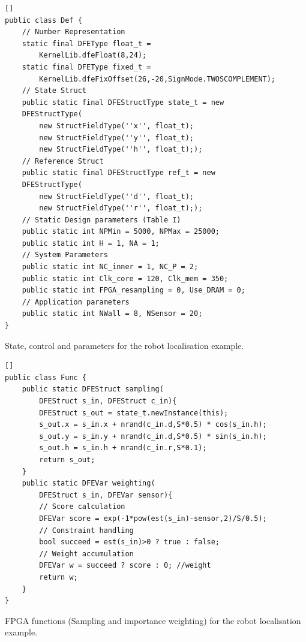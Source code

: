 \begin{Code}
    \centering
\lstset{language=Java,
        basicstyle=\ttfamily\small,
				tabsize=2,
				numbers=left,
				numberstyle=\tiny,
				frame=tb,
				columns=fullflexible,
				showstringspaces=false
				}
\begin{lstlisting}[][]
public class Def {
	// Number Representation
	static final DFEType float_t = 
		KernelLib.dfeFloat(8,24);
	static final DFEType fixed_t = 
		KernelLib.dfeFixOffset(26,-20,SignMode.TWOSCOMPLEMENT);
	// State Struct
	public static final DFEStructType state_t = new 
	DFEStructType(
		new StructFieldType(''x'', float_t);
		new StructFieldType(''y'', float_t);
		new StructFieldType(''h'', float_t););
	// Reference Struct
	public static final DFEStructType ref_t = new 
	DFEStructType(
		new StructFieldType(''d'', float_t);
		new StructFieldType(''r'', float_t););
	// Static Design parameters (Table I)
	public static int NPMin = 5000, NPMax = 25000;
	public static int H = 1, NA = 1;
	// System Parameters
	public static int NC_inner = 1, NC_P = 2;
	public static int Clk_core = 120, Clk_mem = 350;
	public static int FPGA_resampling = 0, Use_DRAM = 0;
	// Application parameters
	public static int NWall = 8, NSensor = 20;
}
\end{lstlisting}
\caption{State, control and parameters for the robot localisation example.}
\label{lst:def}
\end{Code}

\begin{Code}
\centering
\lstset{language=Java,
        basicstyle=\ttfamily\small,
				tabsize=2,
				numbers=left,
				numberstyle=\tiny,
				frame=tb,
				columns=fullflexible,
				showstringspaces=false
				}
\begin{lstlisting}[][]
public class Func {
	public static DFEStruct sampling(
		DFEStruct s_in, DFEStruct c_in){
		DFEStruct s_out = state_t.newInstance(this);
		s_out.x = s_in.x + nrand(c_in.d,S*0.5) * cos(s_in.h);
		s_out.y = s_in.y + nrand(c_in.d,S*0.5) * sin(s_in.h);
		s_out.h = s_in.h + nrand(c_in.r,S*0.1);
		return s_out;
	}
	public static DFEVar weighting(
		DFEStruct s_in, DFEVar sensor){
		// Score calculation
		DFEVar score = exp(-1*pow(est(s_in)-sensor,2)/S/0.5);
		// Constraint handling
		bool succeed = est(s_in)>0 ? true : false;
		// Weight accumulation
		DFEVar w = succeed ? score : 0; //weight
		return w;
	}
}
\end{lstlisting}
\caption{FPGA functions (Sampling and importance weighting) for the robot localisation example.}
\label{lst:func}
\end{Code}


